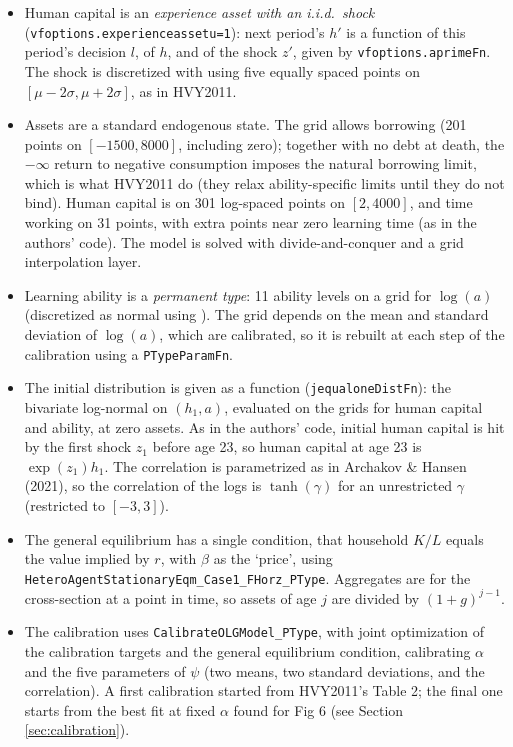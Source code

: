 \documentclass[11pt,fleqn]{article}
\begin{document}
\begin{itemize}
 \item Human capital is an \emph{experience asset with an i.i.d.\ shock} (\verb|vfoptions.experienceassetu=1|): next period's $h'$ is a function of this period's decision $l$, of $h$, and of the shock $z'$, given by \verb|vfoptions.aprimeFn|. The shock is discretized with \cite{Tauchen1986} using five equally spaced points on $[\mu-2\sigma,\mu+2\sigma]$, as in HVY2011.
 \item Assets are a standard endogenous state. The grid allows borrowing (201 points on $[-1500,8000]$, including zero); together with no debt at death, the $-\infty$ return to negative consumption imposes the natural borrowing limit, which is what HVY2011 do (they relax ability-specific limits until they do not bind). Human capital is on 301 log-spaced points on $[2,4000]$, and time working on 31 points, with extra points near zero learning time (as in the authors' code). The model is solved with divide-and-conquer and a grid interpolation layer.
 \item Learning ability is a \emph{permanent type}: 11 ability levels on a grid for $\log(a)$ (discretized as normal using \cite{FarmerToda2017}). The grid depends on the mean and standard deviation of $\log(a)$, which are calibrated, so it is rebuilt at each step of the calibration using a \verb|PTypeParamFn|.
 \item The initial distribution is given as a function (\verb|jequaloneDistFn|): the bivariate log-normal on $(h_1,a)$, evaluated on the grids for human capital and ability, at zero assets. As in the authors' code, initial human capital is hit by the first shock $z_1$ before age 23, so human capital at age 23 is $\exp(z_1)h_1$. The correlation is parametrized as in Archakov \& Hansen (2021), so the correlation of the logs is $\tanh(\gamma)$ for an unrestricted $\gamma$ (restricted to $[-3,3]$).
 \item The general equilibrium has a single condition, that household $K/L$ equals the value implied by $r$, with $\beta$ as the `price', using \verb|HeteroAgentStationaryEqm_Case1_FHorz_PType|. Aggregates are for the cross-section at a point in time, so assets of age $j$ are divided by $(1+g)^{j-1}$.
 \item The calibration uses \verb|CalibrateOLGModel_PType|, with joint optimization of the calibration targets and the general equilibrium condition, calibrating $\alpha$ and the five parameters of $\psi$ (two means, two standard deviations, and the correlation). A first calibration started from HVY2011's Table 2; the final one starts from the best fit at fixed $\alpha$ found for Fig 6 (see Section \ref{sec:calibration}).
\end{itemize}
\end{document}
